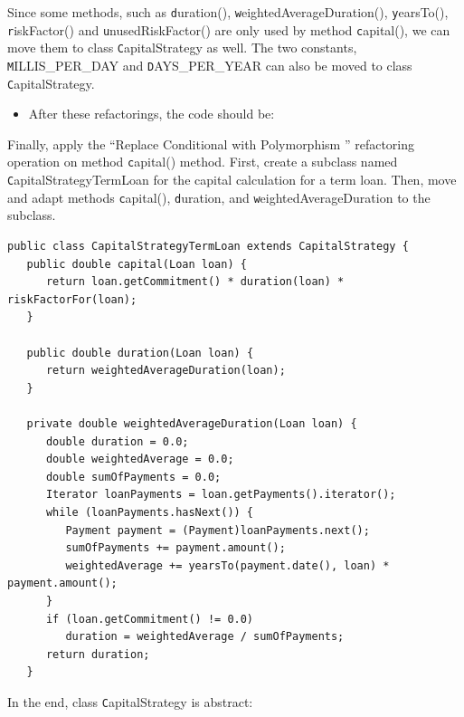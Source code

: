 \documentclass[a4paper,11pt]{memoir}
\newcommand{\code}[1]{{\texttt #1}}
\begin{document}
\begin{exercise}
	Since some methods, such as \code{duration()}, \code{weightedAverageDuration()}, \code{yearsTo()},  \code{riskFactor()} and \code{unusedRiskFactor()} are only used by method \code{capital()}, we can move them to class \code{CapitalStrategy} as well.
	The two constants, \code{MILLIS\_PER\_DAY} and \code{DAYS\_PER\_YEAR} can also be moved to class  \code{CapitalStrategy}.
\end{exercise}
\begin{solution}
	\begin{itemize}
		\item After these refactorings, the code should be: 
	\end{itemize}
	
	\lstset{caption=The CapitalStrategy Class,label=lst:capital:strategy,float=htbp}
	
\end{solution}

\begin{exercise}
	Finally, apply the ``Replace Conditional with Polymorphism '' refactoring operation on method \code{capital()} method. 
	First, create a subclass named \code{CapitalStrategyTermLoan} for the capital calculation for a term loan.
	Then, move and adapt methods \code{capital()}, \code{duration}, and \code{weightedAverageDuration} to the subclass.
\end{exercise}

\begin{solution}
	\begin{lstlisting}[caption=cap,label=lst:lab]
public class CapitalStrategyTermLoan extends CapitalStrategy {
   public double capital(Loan loan) {
      return loan.getCommitment() * duration(loan) * riskFactorFor(loan);
   }

   public double duration(Loan loan) {
      return weightedAverageDuration(loan);
   }

   private double weightedAverageDuration(Loan loan) {
      double duration = 0.0;
      double weightedAverage = 0.0;
      double sumOfPayments = 0.0;
      Iterator loanPayments = loan.getPayments().iterator();
      while (loanPayments.hasNext()) {
         Payment payment = (Payment)loanPayments.next();
         sumOfPayments += payment.amount();
         weightedAverage += yearsTo(payment.date(), loan) * payment.amount();
      }
      if (loan.getCommitment() != 0.0)
         duration = weightedAverage / sumOfPayments;
      return duration;
   }		
	\end{lstlisting}

In the end, class \code{CapitalStrategy} is abstract:


	

\end{solution}
\end{document}

